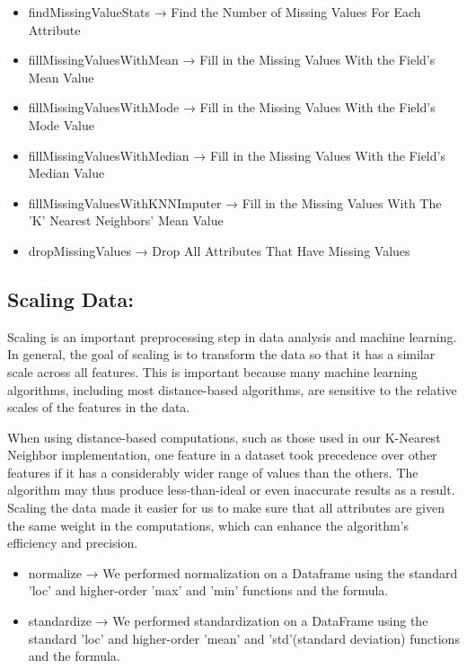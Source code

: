 \documentclass[10pt,twocolumn,letterpaper]{article}
\begin{document}
\begin{itemize}
    \item findMissingValueStats → Find the Number of Missing Values For Each Attribute
    \item fillMissingValuesWithMean → Fill in the Missing Values With the Field's Mean Value
    \item fillMissingValuesWithMode → Fill in the Missing Values With the Field's Mode Value
    \item fillMissingValuesWithMedian → Fill in the Missing Values With the Field's Median Value
    \item fillMissingValuesWithKNNImputer → Fill in the Missing Values With The 'K' Nearest Neighbors' Mean Value 
    \item dropMissingValues → Drop All Attributes That Have Missing Values
\end{itemize}


\subsection{Scaling Data:}
Scaling is an important preprocessing step in data analysis and machine learning. In general, the goal of scaling is to transform the data so that it has a similar scale across all features. This is important because many machine learning algorithms, including most distance-based algorithms, are sensitive to the relative scales of the features in the data.

When using distance-based computations, such as those used in our K-Nearest Neighbor implementation, one feature in a dataset took precedence over other features if it has a considerably wider range of values than the others. The algorithm may thus produce less-than-ideal or even inaccurate results as a result. Scaling the data made it easier for us to make sure that all attributes are given the same weight in the computations, which can enhance the algorithm's efficiency and precision.

\begin{itemize}
    \item normalize → We performed normalization on a Dataframe using the standard 'loc' and higher-order 'max' and 'min' functions and the formula.
    \item standardize → We performed standardization on a DataFrame using the standard 'loc' and higher-order 'mean' and 'std'(standard deviation) functions and the formula.
\end{itemize}
\end{document}
